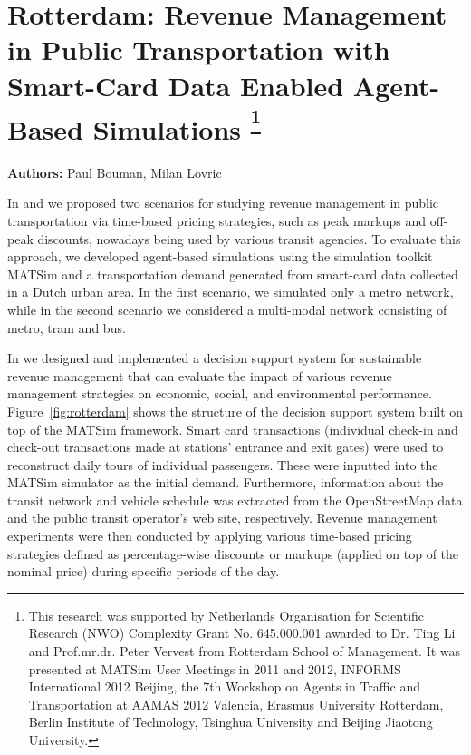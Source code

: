 \section{Rotterdam: Revenue Management in Public Transportation with Smart-Card Data Enabled Agent-Based Simulations \textsuperscript{\footnotesize{\footnote{This research was supported by Netherlands Organisation for Scientific Research (NWO)
Complexity Grant No. 645.000.001 awarded to Dr. Ting Li and Prof.mr.dr. Peter Vervest from
Rotterdam School of Management. It was presented at MATSim User Meetings in 2011 and 2012,
INFORMS International 2012 Beijing, the 7th Workshop on Agents in Traffic and Transportation at
AAMAS 2012 Valencia, Erasmus University Rotterdam, Berlin Institute of Technology, Tsinghua
University and Beijing Jiaotong University.}}}}
\label{sec:rotterdam}
\hfill \textbf{Authors:} Paul Bouman, Milan Lovric

In \citet[][]{LovricEtAl_DSS_2013} and \citet[][]{BoumanEtAl_AAMAS_2012} we proposed two scenarios for studying revenue management in public transportation via time-based pricing strategies, such as peak markups and off-peak discounts, nowadays being used by various transit agencies. To evaluate this approach, we developed agent-based simulations using the simulation toolkit MATSim and a transportation demand generated from smart-card data collected in a Dutch urban area. In the first scenario, we simulated only a metro network, while in the second scenario we considered a multi-modal network consisting of metro, tram and bus.

In \citet[][]{LovricEtAl_DSS_2013} we designed and implemented a decision support system for sustainable revenue management that can evaluate the impact of various revenue management strategies on economic, social, and environmental performance. Figure~\ref{fig:rotterdam} shows the structure of the decision support system built on top of the MATSim framework. Smart card transactions (individual check-in and check-out transactions made at stations' entrance and exit gates) were used to reconstruct daily tours of individual passengers. These were inputted into the MATSim simulator as the initial demand. Furthermore, information about the transit network and vehicle schedule was extracted from the OpenStreetMap data and the public transit operator's web site, respectively. Revenue management experiments were then conducted by applying various time-based pricing strategies defined as percentage-wise discounts or markups (applied on top of the nominal price) during specific periods of the day. 

